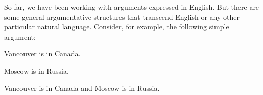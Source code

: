 %
%
%
%
%
%

So far, we have been working with arguments expressed in English. But there are some general argumentative structures that transcend English or any other particular natural language. Consider, for example, the following simple argument:

\begin{earg}
\item[] Vancouver is in Canada.
\item[] Moscow is in Russia.
\item[\therefore] Vancouver is in Canada and Moscow is in Russia.
\end{earg}

